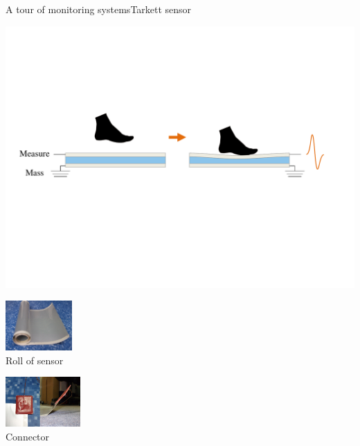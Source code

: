 \documentclass[8pt,t,aspectratio=1610]{beamer}
\newcommand{\ratio}{0.5}
\begin{document}
\begin{frame}{A tour of monitoring systems}{Tarkett sensor}
\begin{minipage}[t]{0.35\linewidth}
\begin{itemize}
    \end{itemize}
\end{minipage}\hfill
\begin{minipage}[t]{0.64\linewidth}
    \vspace{0pt}
    \centering
    \includegraphics[width=0.9\linewidth, trim={20 220 60 170}, clip]{schema_piezo.pdf}\\
    \begin{minipage}[t]{0.49\linewidth}
        \centering
        \includegraphics[width=\linewidth, height=1.9cm, keepaspectratio, trim={0 0 0 0}, clip]{photo_capteur_rouleau.png}\\
        \small Roll of sensor
    \end{minipage}
    \begin{minipage}[t]{0.49\linewidth}
        \centering
        \includegraphics[width=\linewidth, height=1.9cm, keepaspectratio, trim={0 0 0 0}, clip]{photo_capteur_connecteur.png}\\
        \small Connector
    \end{minipage}
    

\end{minipage}
\end{frame}
\end{document}

